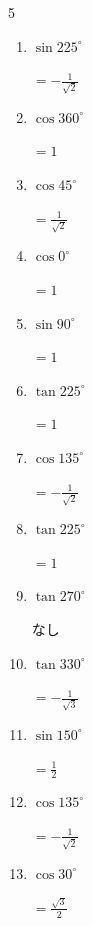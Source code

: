 \begin{multicols}{5}
\begin{enumerate}
  \item $\displaystyle \sin{225^\circ}$

        $\displaystyle =-\frac{1}{\sqrt{2}}$

  \item $\displaystyle \cos{360^\circ}$

        $\displaystyle =1$

  \item $\displaystyle \cos{45^\circ}$

        $\displaystyle =\frac{1}{\sqrt{2}}$

  \item $\displaystyle \cos{0^\circ}$

        $\displaystyle =1$

\columnbreak %

  \item $\displaystyle \sin{90^\circ}$

        $\displaystyle =1$

  \item $\displaystyle \tan{225^\circ}$

        $\displaystyle =1$

  \item $\displaystyle \cos{135^\circ}$

        $\displaystyle =-\frac{1}{\sqrt{2}}$

  \item $\displaystyle \tan{225^\circ}$

        $\displaystyle =1$

  \item $\displaystyle \tan{270^\circ}$

        $\displaystyle なし$

  \item $\displaystyle \tan{330^\circ}$

        $\displaystyle =-\frac{1}{\sqrt{3}}$

  \item $\displaystyle \sin{150^\circ}$

        $\displaystyle =\frac{1}{2}$

  \item $\displaystyle \cos{135^\circ}$

        $\displaystyle =-\frac{1}{\sqrt{2}}$

  \item $\displaystyle \cos{30^\circ}$

        $\displaystyle =\frac{\sqrt{3}}{2}$


\end{enumerate}
\end{multicols}
